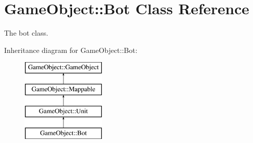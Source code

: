 \hypertarget{classGameObject_1_1Bot}{
\section{GameObject::Bot Class Reference}
\label{classGameObject_1_1Bot}
}


The bot class.  


Inheritance diagram for GameObject::Bot:\begin{figure}[H]
\begin{center}
\leavevmode
\includegraphics[height=4cm]{classGameObject_1_1Bot}
\end{center}
\end{figure}
